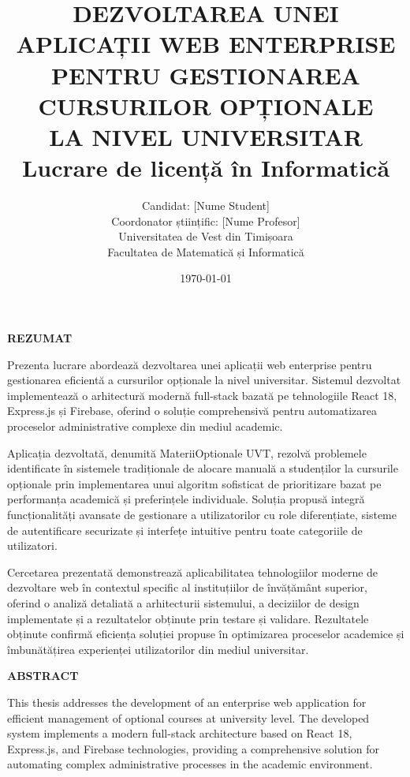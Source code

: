 \documentclass[12pt,a4paper]{report}
\title{\textbf{DEZVOLTAREA UNEI APLICAȚII WEB ENTERPRISE\\PENTRU GESTIONAREA CURSURILOR OPȚIONALE\\LA NIVEL UNIVERSITAR}\\
\vspace{1cm}
\large{Lucrare de licență în Informatică}}
\author{Candidat: [Nume Student]\\
Coordonator științific: [Nume Profesor]\\
\vspace{1cm}
Universitatea de Vest din Timișoara\\
Facultatea de Matematică și Informatică}
\date{\today}
\begin{document}
\maketitle

\newpage
\thispagestyle{empty}
\vspace*{\fill}
\begin{center}
\textbf{REZUMAT}
\end{center}

Prezenta lucrare abordează dezvoltarea unei aplicații web enterprise pentru gestionarea eficientă a cursurilor opționale la nivel universitar. Sistemul dezvoltat implementează o arhitectură modernă full-stack bazată pe tehnologiile React 18, Express.js și Firebase, oferind o soluție comprehensivă pentru automatizarea proceselor administrative complexe din mediul academic.

Aplicația dezvoltată, denumită MateriiOptionale UVT, rezolvă problemele identificate în sistemele tradiționale de alocare manuală a studenților la cursurile opționale prin implementarea unui algoritm sofisticat de prioritizare bazat pe performanța academică și preferințele individuale. Soluția propusă integră funcționalități avansate de gestionare a utilizatorilor cu role diferențiate, sisteme de autentificare securizate și interfețe intuitive pentru toate categoriile de utilizatori.

Cercetarea prezentată demonstrează aplicabilitatea tehnologiilor moderne de dezvoltare web în contextul specific al instituțiilor de învățământ superior, oferind o analiză detaliată a arhitecturii sistemului, a deciziilor de design implementate și a rezultatelor obținute prin testare și validare. Rezultatele obținute confirmă eficiența soluției propuse în optimizarea proceselor academice și îmbunătățirea experienței utilizatorilor din mediul universitar.

\vspace*{\fill}

\newpage
\thispagestyle{empty}
\vspace*{\fill}
\begin{center}
\textbf{ABSTRACT}
\end{center}

This thesis addresses the development of an enterprise web application for efficient management of optional courses at university level. The developed system implements a modern full-stack architecture based on React 18, Express.js, and Firebase technologies, providing a comprehensive solution for automating complex administrative processes in the academic environment.
\end{document}
